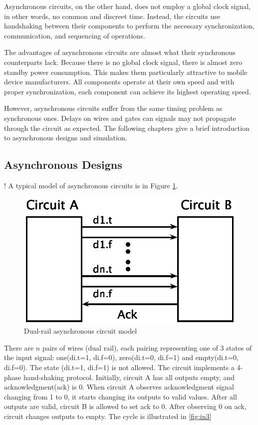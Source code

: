 \documentclass[a4paper,10pt]{article}
\begin{document}
Asynchronous circuits, on the other hand, does not employ a global clock signal, in other words, no common and discreet time.  Instead, the circuits use handshaking between their components to perform the necessary synchronization, communication, and sequencing of operations\cite[Page 3]{bible}.  

The advantages of asynchronous circuits are almost what their synchronous counterparts lack.  Because there is no global clock signal, there is almost zero standby power consumption.  This makes them particularly attractive to mobile device manufacturers\cite[Chapter 7]{jones}.  All components operate at their own speed and with proper synchronization, each component can achieve its highest operating speed\cite[Page 3]{bible}.  

However, asynchronous circuits suffer from the same timing problem as synchronous ones.  Delays on wires and gates can signals may not propagate through the circuit as expected.  The following chapters give a brief introduction to asynchronous designs and simulation.

\subsection{Asynchronous Designs}!
A typical model of asynchronous circuits is in Figure \ref{fig:in2}.

\begin{figure}[H] 
\centering
\includegraphics[scale=.7]{asynchronous_model.eps}
\caption{Dual-rail asynchronous circuit model\cite[Page 13]{bible}} \label{fig:in2}
\end{figure}

There are $n$ pairs of wires (dual rail), each pairing representing one of 3 states of the input signal: one(di.t=1, di.f=0), zero(di.t=0, di.f=1) and empty(di.t=0, di.f=0). The state (di.t=1, di.f=1) is not allowed.  The circuit implements a 4-phase hand-shaking protocol.  Initially, circuit A has all outputs empty, and acknowledgment(ack) is 0.  When circuit A observes acknowledgment signal changing from 1 to 0, it starts changing its outputs to valid values.  After all outputs are valid, circuit B is allowed to set ack to 0.  After observing 0 on ack, circuit changes outputs to empty.  The cycle is illustrated in \ref{fig:in3}
\end{document}
